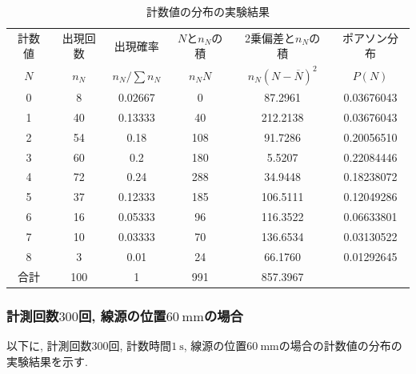 \documentclass{jarticle}
\begin{document}
\begin{table}[H]
  \centering
  \caption{計数値の分布の実験結果}
  \label{tb:count-distribution-100mm-300times}
  \begin{tabular}{cccccc}
    \hline
    計数値 & 出現回数 & 出現確率 & $N$と$n_N$の積 & 2乗偏差と$n_N$の積 & ポアソン分布 \\
    $N$ & $n_N$ & $n_N/\sum n_N$ & $n_N N$ & $n_N(N-\overline{N})^2$ & $P(N)$ \\
    \hline
    0 & 8 & 0.02667 & 0 & 87.2961 & 0.03676043 \\
    1 & 40 & 0.13333 & 40 & 212.2138 & 0.03676043 \\
    2 & 54 & 0.18 & 108 & 91.7286 & 0.20056510 \\
    3 & 60 & 0.2 & 180 & 5.5207 & 0.22084446 \\
    4 & 72 & 0.24 & 288 & 34.9448 & 0.18238072 \\
    5 & 37 & 0.12333 & 185 & 106.5111 & 0.12049286 \\
    6 & 16 & 0.05333 & 96 & 116.3522 & 0.06633801 \\
    7 & 10 & 0.03333 & 70 & 136.6534 & 0.03130522 \\
    8 & 3 & 0.01 & 24 & 66.1760 & 0.01292645 \\
    \hline
    合計 & 100 & 1 & 991 & 857.3967 & \\
    \hline
  \end{tabular}
\end{table}


\subsubsection{計測回数$300$回, 線源の位置$60\ \mathrm{mm}$の場合}

以下に, 計測回数$300$回, 計数時間$1\ \mathrm{s}$, 線源の位置$60\ \mathrm{mm}$の場合の計数値の分布の実験結果を示す.
\end{document}
